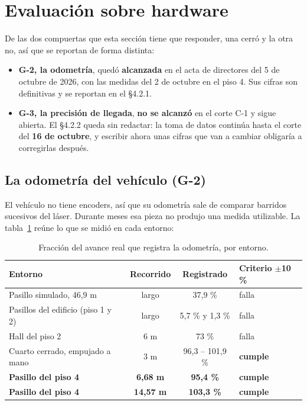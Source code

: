 \section{Evaluación sobre hardware}

\begin{notaavance}
De las dos compuertas que esta sección tiene que responder, una cerró y la otra
no, así que se reportan de forma distinta:

\begin{itemize}[leftmargin=*,nosep]
  \item \textbf{G-2, la odometría}, quedó \textbf{alcanzada} en el acta de
    directores del 5 de octubre de 2026, con las medidas del 2 de octubre en el
    piso 4. Sus cifras son definitivas y se reportan en el §4.2.1.
  \item \textbf{G-3, la precisión de llegada}, \textbf{no se alcanzó} en el
    corte C-1 y sigue abierta. El §4.2.2 queda sin redactar: la toma de datos
    continúa hasta el corte del \textbf{16 de octubre}, y escribir ahora unas
    cifras que van a cambiar obligaría a corregirlas después.
\end{itemize}
\end{notaavance}

\subsection{La odometría del vehículo (G-2)}

El vehículo no tiene encoders, así que su odometría sale de comparar barridos
sucesivos del láser. Durante meses esa pieza no produjo una medida utilizable.
La tabla~\ref{tab:odometria} reúne lo que se midió en cada entorno:

\begin{table}[H]
  \centering\small
  \caption{Fracción del avance real que registra la odometría, por entorno.}
  \label{tab:odometria}
  \begin{tabular}{@{}lccl@{}}
    \toprule
    \textbf{Entorno} & \textbf{Recorrido} & \textbf{Registrado} & \textbf{Criterio $\pm$10 \%} \\ \midrule
    Pasillo simulado, 46,9 m & largo & 37,9 \% & falla \\
    Pasillos del edificio (piso 1 y 2) & largo & 5,7 \% y 1,3 \% & falla \\
    Hall del piso 2 & 6 m & 73 \% & falla \\
    Cuarto cerrado, empujado a mano & 3 m & 96,3 -- 101,9 \% & \textbf{cumple} \\
    \textbf{Pasillo del piso 4} & \textbf{6,68 m} & \textbf{95,4 \%} & \textbf{cumple} \\
    \textbf{Pasillo del piso 4} & \textbf{14,57 m} & \textbf{103,3 \%} & \textbf{cumple} \\ \bottomrule
  \end{tabular}
\end{table}

